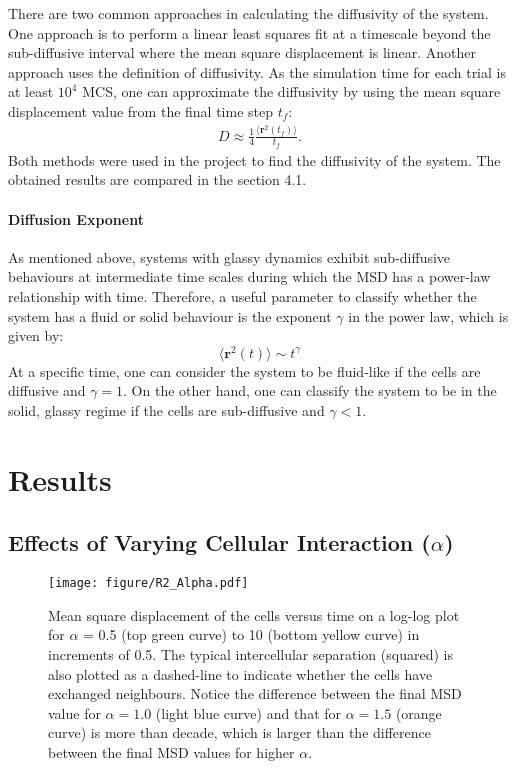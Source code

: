 \documentclass[a4paper,12pt]{article}
\begin{document}
There are two common approaches in calculating the diffusivity of the system. One approach is to perform a linear least squares fit at a timescale beyond the sub-diffusive interval where the mean square displacement is linear. Another approach uses the definition of diffusivity. As the simulation time for each trial is at least $10^4$ MCS, one can approximate the diffusivity by using the mean square displacement value from the final time step $t_f$:
\begin{eqnarray}
D \approx \frac{1}{4} \frac{\langle{\bm{r}^2(t_f)\rangle}}{t_f}.
\end{eqnarray}
Both methods were used in the project to find the diffusivity of the system. The obtained results are compared in the section 4.1.

\paragraph{Diffusion Exponent}
As mentioned above, systems with glassy dynamics exhibit sub-diffusive behaviours at intermediate time scales during which the MSD has a power-law relationship with time. Therefore, a useful parameter to classify whether the system has a fluid or solid behaviour is the exponent $\gamma$ in the power law, which is given by:
\begin{equation}
\langle\bm{r}^2(t)\rangle \sim t^{\gamma}
\end{equation}
At a specific time, one can consider the system to be fluid-like if the cells are diffusive and $\gamma = 1$. On the other hand, one can classify the system to be in the solid, glassy regime if the cells are sub-diffusive and $\gamma < 1$.

\section{Results}
\subsection{Effects of Varying Cellular Interaction ($\alpha$)}
\begin{figure}[h]
\centering
\texttt{[image: figure/R2\_Alpha.pdf]}
\caption{Mean square displacement of the cells versus time on a log-log plot for $\alpha$ = 0.5 (top green curve) to 10 (bottom yellow curve) in increments of 0.5. The typical intercellular separation (squared) is also plotted as a dashed-line to indicate whether the cells have exchanged neighbours. Notice the difference between the final MSD value for $\alpha = 1.0$ (light blue curve) and that for  $\alpha = 1.5$ (orange curve) is more than decade, which is larger than the difference between the final MSD values for higher $\alpha$.
}
\label{fig:r2alpha}
\end{figure}
\end{document}
